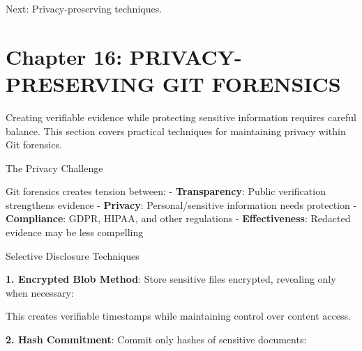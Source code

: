 Next: Privacy-preserving techniques.

\section{Chapter 16: PRIVACY-PRESERVING GIT
FORENSICS}\label{chapter-16-privacy-preserving-git-forensics}

Creating verifiable evidence while protecting sensitive information
requires careful balance. This section covers practical techniques for
maintaining privacy within Git forensics.

The Privacy Challenge

Git forensics creates tension between: - \textbf{Transparency}: Public
verification strengthens evidence - \textbf{Privacy}: Personal/sensitive
information needs protection - \textbf{Compliance}: GDPR, HIPAA, and
other regulations - \textbf{Effectiveness}: Redacted evidence may be
less compelling

Selective Disclosure Techniques

\textbf{1. Encrypted Blob Method}: Store sensitive files encrypted,
revealing only when necessary:

\begin{Shaded}
\begin{Highlighting}[]
  

 

 \OperatorTok{\textgreater{}}
\end{Highlighting}
\end{Shaded}

This creates verifiable timestamps while maintaining control over
content access.

\textbf{2. Hash Commitment}: Commit only hashes of sensitive documents:

\begin{Shaded}
\begin{Highlighting}[]
\OperatorTok{\textgreater{}}

 

\end{Highlighting}
\end{Shaded}

